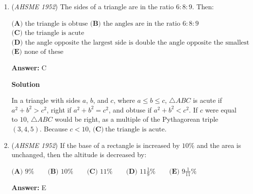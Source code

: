 \begin{enumerate}
 $\textbf{(A) \ }\text{no loss or gain}  \qquad \textbf{(B) \ }\text{loss of }\textdollar 1000 \qquad \textbf{(C) \ }\text{gain of }\textdollar 1000 \qquad \textbf{(D) \ }\text{gain of }\textdollar 2000 \qquad \textbf{(E) \ }\text{none of these}$

 \textbf{Answer: }B



\textbf{Solution}

Denote the original price of the house and the store as $h$ and $s$, respectively. It is given that $\frac{4h}{5}=\textdollar 12,000$, and that $\frac{6s}{5}=\textdollar 12,000$. Thus, $h=\textdollar 15,000$, $s=\textdollar10,000$, and $h+s=\textdollar25,000$. This value is $\textdollar1000$ higher than the current price of the property, $2\cdot \textdollar12,000$. Hence, the transaction resulted in a $\boxed{\textbf{(B)}\ \text{loss of }\textdollar1000}$.

 


	\item (\textit{AHSME 1952}) The sides of a triangle are in the ratio $6:8:9$. Then:


 $\textbf{(A) \ }\text{the triangle is obtuse}$
$\textbf{(B) \ }\text{the angles are in the ratio }6:8:9$
$\textbf{(C) \ }\text{the triangle is acute}$
$\textbf{(D) \ }\text{the angle opposite the largest side is double the angle opposite the smallest side}$
$\textbf{(E) \ }\text{none of these}$

 \textbf{Answer: }C



\textbf{Solution}

In a triangle with sides $a$, $b$, and $c$, where $a\le b\le c$, $\bigtriangleup ABC$ is acute if $a^2+b^2>c^2$, right if $a^2+b^2=c^2$, and obtuse if $a^2+b^2<c^2$. If $c$ were equal to $10$, $\bigtriangleup ABC$ would be right, as a multiple of the Pythagorean triple $(3,4,5)$. Because $c<10$, $\boxed{\textbf{(C)}\ \text{the triangle is acute}}$.

 


	\item (\textit{AHSME 1952}) If the base of a rectangle is increased by $10\%$ and the area is unchanged, then the altitude is decreased by:


 $\textbf{(A) \ }9\%  \qquad \textbf{(B) \ }10\% \qquad \textbf{(C) \ }11\% \qquad \textbf{(D) \ }11\frac{1}{9}\% \qquad \textbf{(E) \ }9\frac{1}{11}\%$

 \textbf{Answer: }E




\end{enumerate}
